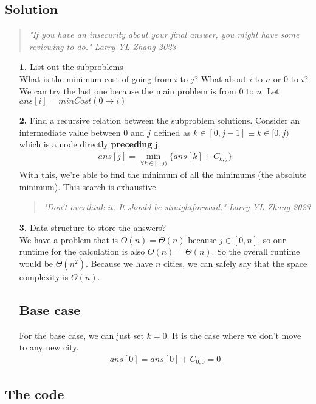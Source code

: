 \documentclass[12pt]{book}
\begin{document}
\subsection*{Solution}
\begin{quote}
    \textit{"If you have an insecurity about your final answer, you might have some reviewing to do."-Larry YL Zhang 2023}
\end{quote}
\begin{itemize}
    \item[\textbf{1.}] List out the subproblems\\
    What is the minimum cost of going from $i$ to $j$? What about $i$ to $n$ or $0$ to $i$? We can try the last one because the main problem is from $0$ to $n$. Let $ans[i]=minCost(0\rightarrow i)$
    \item[\textbf{2.}] Find a recursive relation between the subproblem solutions. Consider an intermediate value between $0$ and $j$ defined as $k\in[0,j-1]\equiv k\in[0,j)$ which is a node directly \textbf{preceding} j.
    \begin{align*}
        ans[j]=\min_{\forall k\in[0,j)}\{ans[k]+C_{k,j}\}
    \end{align*}
    With this, we're able to find the minimum of all the minimums (the absolute minimum). This search is exhaustive.
    \begin{quote}
        \textit{"Don't overthink it. It should be straightforward."-Larry YL Zhang 2023}
    \end{quote}

    \item[\textbf{3.}] Data structure to store the answers?\\ We have a problem that is $O(n)=\Theta(n)$ because $j\in [0,n]$, so our runtime for the calculation is also $O(n)=\Theta(n)$. So the overall runtime would be $\Theta(n^2)$. Because we have $n$ cities, we can safely say that the space complexity is $\Theta(n)$.
    
    \subsection*{Base case}
    For the base case, we can just set $k=0$. It is the case where we don't move to any new city.
    \begin{align*}
        ans[0]=ans[0]+C_{0,0}=0
    \end{align*}
\end{itemize}

\subsection*{The code}
\end{document}
